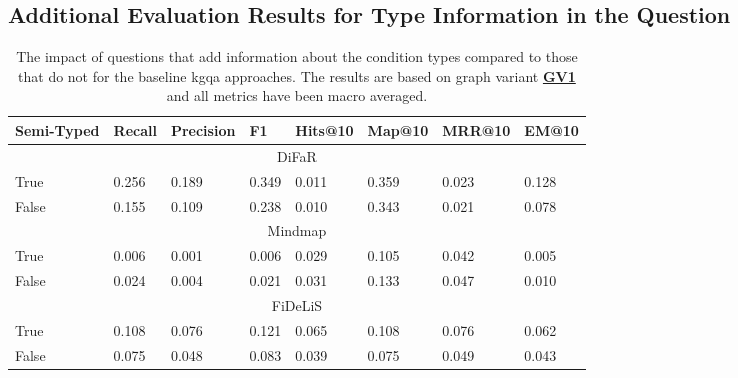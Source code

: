 \subsection{Additional Evaluation Results for Type Information in the Question}
\label{sec:appendix:additional_evaluation_results_type_information}

\begin{table}[H]
\centering
\begin{tabular}{@{}llllllll@{}}
\toprule
Semi-Typed & Recall & Precision & F1 & Hits@10 & Map@10 & MRR@10 & EM@10 \\ 
\midrule
\multicolumn{8}{c}{DiFaR} \\
\midrule
True & 0.256 & 0.189 & 0.349 & 0.011 & 0.359 & 0.023 & 0.128 \\ 
False & 0.155 & 0.109 & 0.238 & 0.010 & 0.343 & 0.021 & 0.078 \\ 
\midrule
\multicolumn{8}{c}{Mindmap} \\
\midrule
True & 0.006 & 0.001 & 0.006 & 0.029 & 0.105 & 0.042 & 0.005 \\ 
False & 0.024 & 0.004 & 0.021 & 0.031 & 0.133 & 0.047 & 0.010 \\ 
\midrule
\multicolumn{8}{c}{FiDeLiS} \\
\midrule
True & 0.108 & 0.076 & 0.121 & 0.065 & 0.108 & 0.076 & 0.062 \\ 
False & 0.075 & 0.048 & 0.083 & 0.039 & 0.075 & 0.049 & 0.043 \\ 
\bottomrule
\end{tabular}%
\caption[Results for Baselines on Semi-Typed Questions]{The impact of questions that add information about the condition types compared to those that do not for the baseline \gls{kgqa} approaches. The results are based on graph variant \hyperref[enum:gv1]{\textbf{GV1}} and all metrics have been macro averaged.}
\label{tab:baseline_performance_semi_typed}
\end{table}